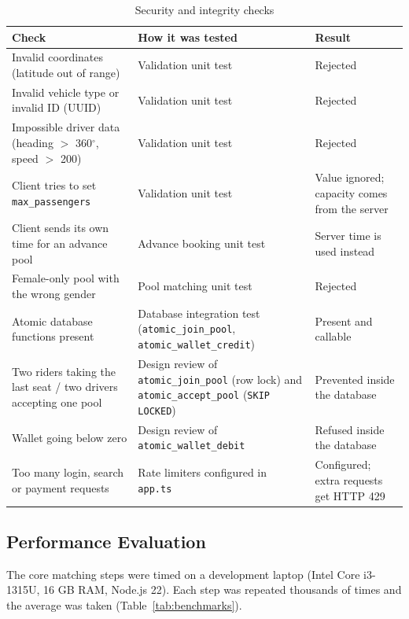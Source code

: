 \begin{table}[H]
  \centering
  \small
  \caption{Security and integrity checks}
  \label{tab:security-checks}
  \begin{tabularx}{\textwidth}{@{}LLp{3.8cm}@{}}
    \toprule
    \textbf{Check} & \textbf{How it was tested} & \textbf{Result} \\
    \midrule
    Invalid coordinates (latitude out of range) & Validation unit test & Rejected \\
    Invalid vehicle type or invalid ID (UUID) & Validation unit test & Rejected \\
    Impossible driver data (heading $>$ 360$^\circ$, speed $>$ 200) & Validation unit test & Rejected \\
    Client tries to set \texttt{max\_passengers} & Validation unit test & Value ignored; capacity comes from the server \\
    Client sends its own time for an advance pool & Advance booking unit test & Server time is used instead \\
    Female-only pool with the wrong gender & Pool matching unit test & Rejected \\
    Atomic database functions present & Database integration test (\texttt{atomic\_join\_pool}, \texttt{atomic\_wallet\_credit}) & Present and callable \\
    Two riders taking the last seat / two drivers accepting one pool & Design review of \texttt{atomic\_join\_pool} (row lock) and \texttt{atomic\_accept\_pool} (\texttt{SKIP LOCKED}) & Prevented inside the database \\
    Wallet going below zero & Design review of \texttt{atomic\_wallet\_debit} & Refused inside the database \\
    Too many login, search or payment requests & Rate limiters configured in \texttt{app.ts} & Configured; extra requests get HTTP 429 \\
    \bottomrule
  \end{tabularx}
\end{table}

\subsection{Performance Evaluation}
\label{subsec:performance}

The core matching steps were timed on a development laptop (Intel Core
i3-1315U, 16 GB RAM, Node.js 22). Each step was repeated thousands of times and
the average was taken (Table~\ref{tab:benchmarks}).

